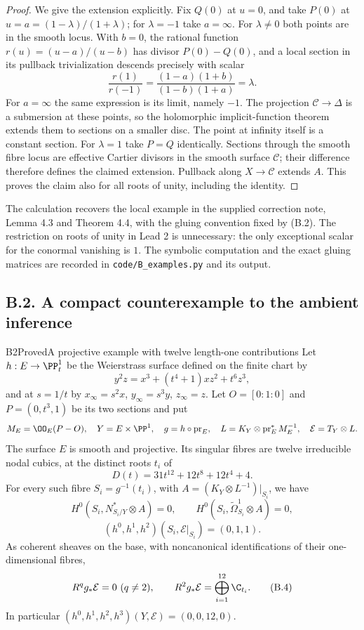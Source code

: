 \begin{proof}
We give the extension explicitly. Fix $Q(0)$ at $u=0$, and take $P(0)$ at $u=a=(1-\lambda)/(1+\lambda)$; for $\lambda=-1$ take $a=\infty$. For $\lambda\ne0$ both points are in the smooth locus. With $b=0$, the rational function $r(u)=(u-a)/(u-b)$ has divisor $P(0)-Q(0)$, and a local section in its pullback trivialization descends precisely with scalar
\[
 \frac{r(1)}{r(-1)}
 =\frac{(1-a)(1+b)}{(1-b)(1+a)}=\lambda.
\]
For $a=\infty$ the same expression is its limit, namely $-1$. The projection $\mathcal C\to\Delta$ is a submersion at these points, so the holomorphic implicit-function theorem extends them to sections on a smaller disc. The point at infinity itself is a constant section. For $\lambda=1$ take $P=Q$ identically. Sections through the smooth fibre locus are effective Cartier divisors in the smooth surface $\mathcal C$; their difference therefore defines the claimed extension. Pullback along $X\to\mathcal C$ extends $A$. This proves the claim also for all roots of unity, including the identity.
\end{proof}

The calculation recovers the local example in the supplied correction note, Lemma 4.3 and Theorem 4.4, with the gluing convention fixed by (B.2). The restriction on roots of unity in Lead 2 is unnecessary: the only exceptional scalar for the conormal vanishing is $1$. The symbolic computation and the exact gluing matrices are recorded in \texttt{code/B\_examples.py} and its output.


\subsection{B.2. A compact counterexample to the ambient inference}


\begin{statement}{B2}{Proved}{A projective example with twelve length-one contributions}
Let $h:E\to\PP^1_t$ be the Weierstrass surface defined on the finite chart by
\[
 y^2z=x^3+(t^4+1)xz^2+t^6z^3,                          \tag{B.3}
\]
and at $s=1/t$ by $x_\infty=s^2x$, $y_\infty=s^3y$, $z_\infty=z$. Let $O=[0:1:0]$ and $P=(0,t^3,1)$ be its two sections and put
\[
 M_E=\OO_E(P-O),\quad Y=E\times\PP^1,\quad
 g=h\circ\operatorname{pr}_E,\quad
 L=K_Y\otimes\operatorname{pr}_E^*M_E^{-1},\quad
 \mathcal E=T_Y\otimes L.
\]
The surface $E$ is smooth and projective. Its singular fibres are twelve irreducible nodal cubics, at the distinct roots $t_i$ of
\[
 D(t)=31t^{12}+12t^8+12t^4+4.
\]
For every such fibre $S_i=g^{-1}(t_i)$, with $A=(K_Y\otimes L^{-1})|_{S_i}$, we have
\[
H^0(S_i,N^*_{S_i/Y}\otimes A)=0,
\qquad H^0(S_i,\widetilde\Omega^1_{S_i}\otimes A)=0,
\]
\[
 (h^0,h^1,h^2)(S_i,\mathcal E|_{S_i})=(0,1,1).
\]
As coherent sheaves on the base, with noncanonical identifications of their one-dimensional fibres,
\[
 R^qg_*\mathcal E=0\ (q\ne2),\qquad
 R^2g_*\mathcal E=\bigoplus_{i=1}^{12}\C_{t_i}.        \tag{B.4}
\]
In particular $(h^0,h^1,h^2,h^3)(Y,\mathcal E)=(0,0,12,0)$.
\end{statement}

